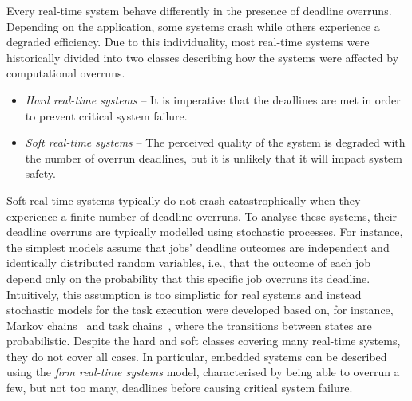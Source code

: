 Every real-time system behave differently in the presence of deadline overruns.
Depending on the application, some systems crash while others experience a degraded efficiency.
Due to this individuality, most real-time systems were historically divided into two classes describing how the systems were affected by computational overruns.
%
\begin{itemize}
    \item \emph{Hard real-time systems} -- It is imperative that the deadlines are met in order to prevent critical system failure.

    \item \emph{Soft real-time systems} -- The perceived quality of the system is degraded with the number of overrun deadlines, but it is unlikely that it will impact system safety.
\end{itemize}
%
Soft real-time systems typically do not crash catastrophically when they experience a finite number of deadline overruns.
To analyse these systems, their deadline overruns are typically modelled using stochastic processes.
For instance, the simplest models assume that jobs' deadline outcomes are independent and identically distributed random variables, i.e., that the outcome of each job depend only on the probability that this specific job overruns its deadline.
Intuitively, this assumption is too simplistic for real systems and instead stochastic models for the task execution were developed based on, for instance, Markov chains~\cite{Liu:2005, Friebe:2022, Abeni:2017, Lincoln:2002} and task chains~\cite{Manolache:2004, Liu:2010}, where the transitions between states are probabilistic.
Despite the hard and soft classes covering many real-time systems, they do not cover all cases.
In particular, embedded systems can be described using the \emph{firm real-time systems} model, characterised by being able to overrun a few, but not too many, deadlines before causing critical system failure.

